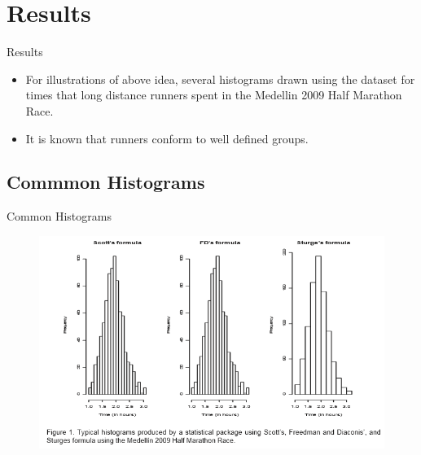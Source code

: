 \documentclass{beamer}
\begin{document}
\section{Results}
\begin{frame}{Results}
	\begin{itemize}
		\item For illustrations of above idea, several histograms drawn using the dataset for times that long distance runners spent in the Medellin 2009 Half Marathon Race. 
		\item It is known that runners conform to well defined groups.
	\end{itemize}
\end{frame}

\subsection{Commmon Histograms}
\begin{frame}{Common Histograms}

	\begin{figure}[t]
		\centering
       		\includegraphics[scale=0.6]{figure1}
 
	\end{figure}

\end{frame}
\end{document}
